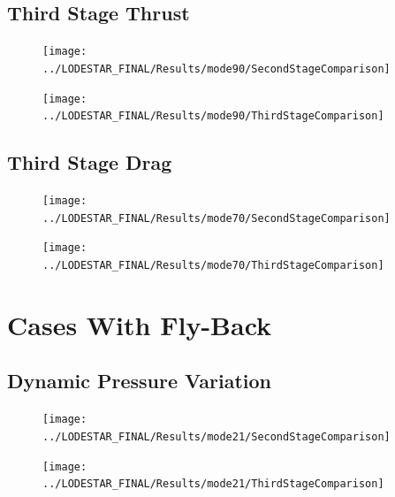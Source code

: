 \FloatBarrier
\subsection{Third Stage Thrust}

\begin{figure}[th]
	\centering
	\texttt{[image: ../LODESTAR\_FINAL/Results/mode90/SecondStageComparison]}
	\caption{}
	\label{fig:SecondStageComparison7}
\end{figure}

\begin{figure}[th]
\centering
\texttt{[image: ../LODESTAR\_FINAL/Results/mode90/ThirdStageComparison]}
\caption{}
\label{fig:ThirdStageComparison7}
\end{figure}
\FloatBarrier
\subsection{Third Stage Drag}

\begin{figure}[th]
\centering
\texttt{[image: ../LODESTAR\_FINAL/Results/mode70/SecondStageComparison]}
\caption{}
\label{fig:SecondStageComparison8}
\end{figure}


\begin{figure}[th]
\centering
\texttt{[image: ../LODESTAR\_FINAL/Results/mode70/ThirdStageComparison]}
\caption{}
\label{fig:ThirdStageComparison8}
\end{figure}


\section{Cases With Fly-Back}

\subsection{Dynamic Pressure Variation}
\begin{figure}[th]
\centering
\texttt{[image: ../LODESTAR\_FINAL/Results/mode21/SecondStageComparison]}
\caption{}
\label{fig:SecondStageComparison9}
\end{figure}

\begin{figure}[th]
\centering
\texttt{[image: ../LODESTAR\_FINAL/Results/mode21/ThirdStageComparison]}
\caption{}
\label{fig:ThirdStageComparison9}
\end{figure}



